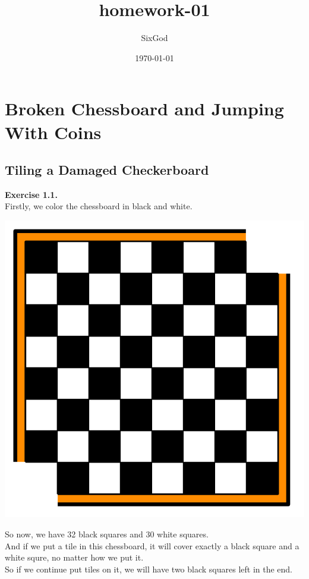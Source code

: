 \documentclass{article}
\title{\textbf{homework-01}}
\author{SixGod}
\date{\today}
\begin{document}
\maketitle

\section{Broken Chessboard and Jumping With Coins}
\subsection{Tiling a Damaged Checkerboard}

\begin{flushleft}
\textbf{Exercise 1.1.} \\
Firstly, we color the chessboard in black and white.\\
\begin{center}
\includegraphics[scale=0.3]{1_1_1.png}
\end{center}
So now, we have 32 black squares and 30 white squares.\\
And if we put a tile in this chessboard, it will cover exactly a black square and a white squre, no matter how we put it.\\
So if we continue put tiles on it, we will have two black squares left in the end.\\

\end{flushleft}
\end{document}
